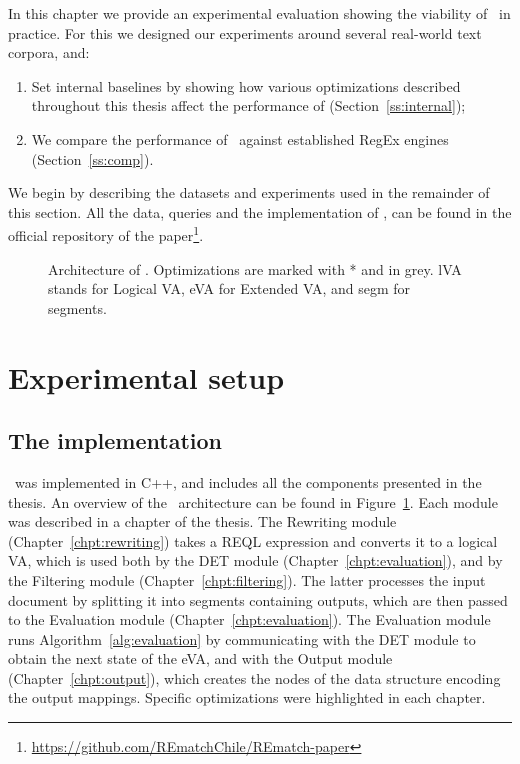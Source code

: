 
In this chapter we provide an experimental evaluation showing the viability of
\rematch\ in practice. For this we designed our experiments around several
real-world text corpora, and: 
\begin{enumerate}
	\item Set internal baselines by showing how various optimizations described
	throughout this thesis affect the performance of \rematch{}
	(Section~\ref{ss:internal});
	\item We compare the performance of \rematch\ against established RegEx
	engines  (Section~\ref{ss:comp}).
\end{enumerate}
We begin by describing the datasets and experiments used in the remainder of
this section. All the data, queries and the implementation of \rematch, can be
found in the official repository of the
paper\footnote{\url{https://github.com/REmatchChile/REmatch-paper}}.


\begin{figure}[t]
	
	\caption{Architecture of \rematch. Optimizations are marked with * and in grey. lVA stands for Logical VA, eVA for Extended VA, and segm for segments.}
	\label{fig:architecture}
\end{figure}

\section{Experimental setup}
\label{ss:setup}

\subsection{The implementation}
\rematch\ was implemented in C++, and includes all the components presented in
the thesis. An overview of the \rematch\ architecture can be found in
Figure~\ref{fig:architecture}. Each module was described in a chapter of the
thesis. The Rewriting module (Chapter~\ref{chpt:rewriting}) takes a REQL
expression and converts it to a logical VA, which is used both by the
\textsf{DET} module (Chapter~\ref{chpt:evaluation}), and by the Filtering module
(Chapter~\ref{chpt:filtering}). The latter processes the input document by
splitting it into segments containing outputs, which are then passed to the
Evaluation module (Chapter~\ref{chpt:evaluation}). The Evaluation module runs
Algorithm~\ref{alg:evaluation} by communicating with the \textsf{DET} module to
obtain the next state of the eVA, and with the Output module
(Chapter~\ref{chpt:output}), which creates the nodes of the data structure
encoding the output mappings. Specific optimizations were highlighted in each
chapter.


